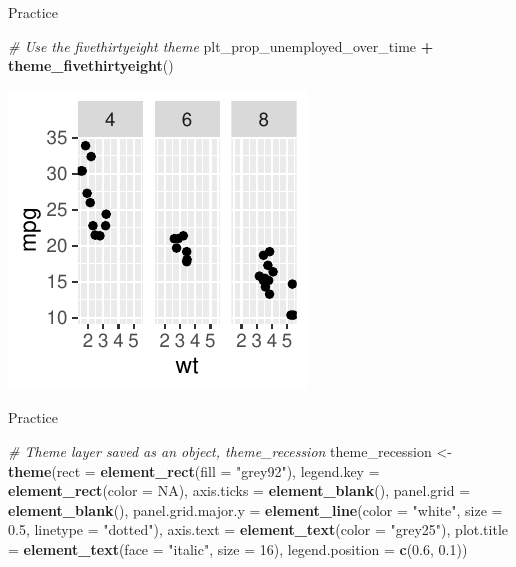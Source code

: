 \documentclass[
  ignorenonframetext,
]{beamer}
\newenvironment{Shaded}{\begin{snugshade}}{\end{snugshade}}
\newcommand{\AttributeTok}[1]{\textcolor[rgb]{0.13,0.29,0.53}{#1}}
\newcommand{\CommentTok}[1]{\textcolor[rgb]{0.56,0.35,0.01}{\textit{#1}}}
\newcommand{\ConstantTok}[1]{\textcolor[rgb]{0.56,0.35,0.01}{#1}}
\newcommand{\DecValTok}[1]{\textcolor[rgb]{0.00,0.00,0.81}{#1}}
\newcommand{\FloatTok}[1]{\textcolor[rgb]{0.00,0.00,0.81}{#1}}
\newcommand{\FunctionTok}[1]{\textcolor[rgb]{0.13,0.29,0.53}{\textbf{#1}}}
\newcommand{\NormalTok}[1]{#1}
\newcommand{\OtherTok}[1]{\textcolor[rgb]{0.56,0.35,0.01}{#1}}
\newcommand{\SpecialCharTok}[1]{\textcolor[rgb]{0.81,0.36,0.00}{\textbf{#1}}}
\newcommand{\StringTok}[1]{\textcolor[rgb]{0.31,0.60,0.02}{#1}}
\begin{document}
\begin{frame}[fragile]{Practice}
\label{practice-7}

\begin{Shaded}
\begin{Highlighting}[]
\CommentTok{\# Use the fivethirtyeight theme}
\NormalTok{plt\_prop\_unemployed\_over\_time }\SpecialCharTok{+} \FunctionTok{theme\_fivethirtyeight}\NormalTok{()}
\end{Highlighting}
\end{Shaded}

\begin{center}\includegraphics[width=0.5\linewidth]{Figs/unnamed-chunk-88-1} \end{center}
\end{frame}

\begin{frame}[fragile]{Practice}
\label{practice-8}

\begin{Shaded}
\begin{Highlighting}[]
\CommentTok{\# Theme layer saved as an object, theme\_recession}
\NormalTok{theme\_recession }\OtherTok{\textless{}{-}} \FunctionTok{theme}\NormalTok{(}\AttributeTok{rect =} \FunctionTok{element\_rect}\NormalTok{(}\AttributeTok{fill =} \StringTok{"grey92"}\NormalTok{),}
    \AttributeTok{legend.key =} \FunctionTok{element\_rect}\NormalTok{(}\AttributeTok{color =} \ConstantTok{NA}\NormalTok{), }\AttributeTok{axis.ticks =} \FunctionTok{element\_blank}\NormalTok{(),}
    \AttributeTok{panel.grid =} \FunctionTok{element\_blank}\NormalTok{(), }\AttributeTok{panel.grid.major.y =} \FunctionTok{element\_line}\NormalTok{(}\AttributeTok{color =} \StringTok{"white"}\NormalTok{,}
        \AttributeTok{size =} \FloatTok{0.5}\NormalTok{, }\AttributeTok{linetype =} \StringTok{"dotted"}\NormalTok{), }\AttributeTok{axis.text =} \FunctionTok{element\_text}\NormalTok{(}\AttributeTok{color =} \StringTok{"grey25"}\NormalTok{),}
    \AttributeTok{plot.title =} \FunctionTok{element\_text}\NormalTok{(}\AttributeTok{face =} \StringTok{"italic"}\NormalTok{, }\AttributeTok{size =} \DecValTok{16}\NormalTok{), }\AttributeTok{legend.position =} \FunctionTok{c}\NormalTok{(}\FloatTok{0.6}\NormalTok{,}
        \FloatTok{0.1}\NormalTok{))}
\end{Highlighting}
\end{Shaded}
\end{frame}
\end{document}
